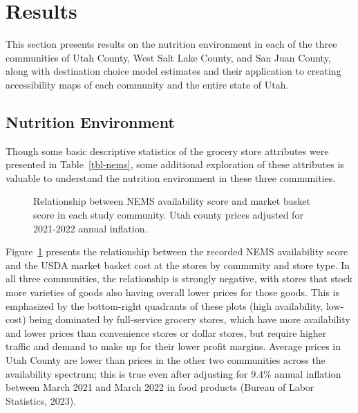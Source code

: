 \documentclass[
  letterpaper,
  number,
  review,
  3p]{elsarticle}
\begin{document}

\section{Results}\label{sec-results}

This section presents results on the nutrition environment in each of
the three communities of Utah County, West Salt Lake County, and San
Juan County, along with destination choice model estimates and their
application to creating accessibility maps of each community and the
entire state of Utah.

\subsection{Nutrition Environment}\label{sec-nems}

Though some basic descriptive statistics of the grocery store attributes
were presented in Table~\ref{tbl-nems}, some additional exploration of
these attributes is valuable to understand the nutrition environment in
these three communities.

\begin{figure}


\caption{\label{fig-nems-market-avail}Relationship between NEMS
availability score and market basket score in each study community. Utah
county prices adjusted for 2021-2022 annual inflation.}

\end{figure}%

Figure~\ref{fig-nems-market-avail} presents the relationship between the
recorded NEMS availability score and the USDA market basket cost at the
stores by community and store type. In all three communities, the
relationship is strongly negative, with stores that stock more varieties
of goods also having overall lower prices for those goods. This is
emphasized by the bottom-right quadrants of these plots (high
availability, low-cost) being dominated by full-service grocery stores,
which have more availability and lower prices than convenience stores or
dollar stores, but require higher traffic and demand to make up for
their lower profit margins. Average prices in Utah County are lower than
prices in the other two communities across the availability spectrum;
this is true even after adjusting for 9.4\% annual inflation between
March 2021 and March 2022 in food products (Bureau of Labor Statistics,
2023).
\end{document}
